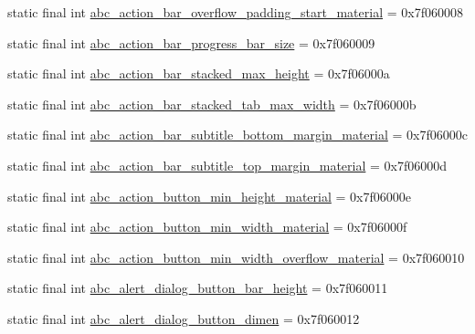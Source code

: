 \begin{DoxyCompactItemize}
\item 
static final int \mbox{\hyperlink{classandroid_1_1support_1_1design_1_1_r_1_1dimen_afcc656fd9ff7526cf3a9713155929f19}{abc\+\_\+action\+\_\+bar\+\_\+overflow\+\_\+padding\+\_\+start\+\_\+material}} = 0x7f060008
\item 
static final int \mbox{\hyperlink{classandroid_1_1support_1_1design_1_1_r_1_1dimen_a0841a2247b3ff85cbcaeda6ea97c0944}{abc\+\_\+action\+\_\+bar\+\_\+progress\+\_\+bar\+\_\+size}} = 0x7f060009
\item 
static final int \mbox{\hyperlink{classandroid_1_1support_1_1design_1_1_r_1_1dimen_ab0160db7b64c23fb4ca25a6506556408}{abc\+\_\+action\+\_\+bar\+\_\+stacked\+\_\+max\+\_\+height}} = 0x7f06000a
\item 
static final int \mbox{\hyperlink{classandroid_1_1support_1_1design_1_1_r_1_1dimen_a8dc041a733fe2e1bb35f5791f118b1e8}{abc\+\_\+action\+\_\+bar\+\_\+stacked\+\_\+tab\+\_\+max\+\_\+width}} = 0x7f06000b
\item 
static final int \mbox{\hyperlink{classandroid_1_1support_1_1design_1_1_r_1_1dimen_aec33706c986e5fc925371f6eb778339c}{abc\+\_\+action\+\_\+bar\+\_\+subtitle\+\_\+bottom\+\_\+margin\+\_\+material}} = 0x7f06000c
\item 
static final int \mbox{\hyperlink{classandroid_1_1support_1_1design_1_1_r_1_1dimen_ab044319f6a390e09597b7a26ca4239fa}{abc\+\_\+action\+\_\+bar\+\_\+subtitle\+\_\+top\+\_\+margin\+\_\+material}} = 0x7f06000d
\item 
static final int \mbox{\hyperlink{classandroid_1_1support_1_1design_1_1_r_1_1dimen_a790b0f15fe5f2eacfa6e795235d9eae4}{abc\+\_\+action\+\_\+button\+\_\+min\+\_\+height\+\_\+material}} = 0x7f06000e
\item 
static final int \mbox{\hyperlink{classandroid_1_1support_1_1design_1_1_r_1_1dimen_a37b1e3c9da74daa257a3a466f77f4af9}{abc\+\_\+action\+\_\+button\+\_\+min\+\_\+width\+\_\+material}} = 0x7f06000f
\item 
static final int \mbox{\hyperlink{classandroid_1_1support_1_1design_1_1_r_1_1dimen_a44e1469815c3f215f8034a6ad69175e4}{abc\+\_\+action\+\_\+button\+\_\+min\+\_\+width\+\_\+overflow\+\_\+material}} = 0x7f060010
\item 
static final int \mbox{\hyperlink{classandroid_1_1support_1_1design_1_1_r_1_1dimen_a0ac12e6518fb27a21c807a9803d7d350}{abc\+\_\+alert\+\_\+dialog\+\_\+button\+\_\+bar\+\_\+height}} = 0x7f060011
\item 
static final int \mbox{\hyperlink{classandroid_1_1support_1_1design_1_1_r_1_1dimen_a2d582375c7bd162e170edd5ec2fe6c37}{abc\+\_\+alert\+\_\+dialog\+\_\+button\+\_\+dimen}} = 0x7f060012

\end{DoxyCompactItemize}
